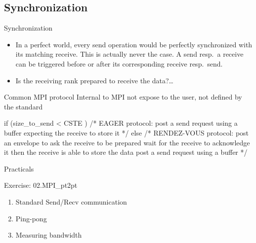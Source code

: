 \documentclass[aspectratio=43]{beamer}
\begin{document}
\subsection{Synchronization}
\begin{frame}[fragile]{Synchronization}
\justifying
\begin{itemize}
\item In a perfect world, every send operation would be perfectly synchronized with its matching receive.
This is actually never the case.
A send resp.\ a receive can be triggered before or after its corresponding receive resp.\ send.\\
\item Is the receiving rank prepared to receive the data?\ldots
\end{itemize}
\begin{blue1block}{Common MPI protocol}
{\color{cscsred}Internal to MPI not expose to the user, not defined by the standard}
\begin{Pseudolisting}{}
if (size_to_send < CSTE ) {
  /* EAGER protocol:
  post a send request using a buffer
  expecting the receive to store it */
} else {
  /* RENDEZ-VOUS protocol:
  post an envelope to ask the receive to be prepared
  wait for the receive to acknowledge it
  then the receive is able to store the data
  post a send request using a buffer */
}
\end{Pseudolisting}
\end{blue1block}
\end{frame}

\begin{frame}{Practicals}
    \begin{brown2block}{Exercise: 02.MPI\_pt2pt}
    \begin{enumerate}
    \item  Standard Send/Recv communication
    \item  Ping-pong
    \item  Measuring bandwidth
    \end{enumerate}
    \end{brown2block}
\end{frame}
\end{document}
